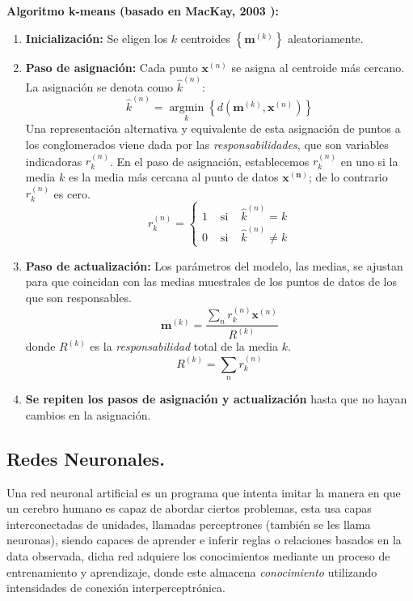 \documentclass[12pt,letterpaper,oneside,openright]{book}
\begin{document}
	\textbf{Algoritmo k-means (basado en MacKay, 2003 \cite{mackay03}):}
	\begin{enumerate}
		\item \textbf{Inicialización:} 
		Se eligen los $k$ centroides $\left\{\mathbf{m}^{(k)}\right\}$ aleatoriamente.
		\item \textbf{Paso de asignación:}
		Cada punto $\mathbf{x}^{(n)}$ se asigna al centroide más cercano. La asignación se denota como $\hat{k}^{(n)}$:
		\begin{equation}
			\label{eq:k_mean_asig}
			\hat{k}^{(n)}=\underset{k}{\operatorname{argmin}}\left\{d\left(\mathbf{m}^{(k)}, \mathbf{x}^{(n)}\right)\right\}
		\end{equation}
		Una representación alternativa y equivalente de esta asignación de puntos a los conglomerados viene dada por las \textit{responsabilidades}, que son variables indicadoras $r_k^{(n)}$. En el paso de asignación, establecemos $r_k^{(n)}$ en uno si la media $k$ es la media más cercana al punto de datos $\mathbf{x^{(n)}}$; de lo contrario $r_k^{(n)}$ es cero.
		\begin{equation}
			\label{eq:cond_rk}
			r_k^{(n)}=\left\{\begin{array}{lll}
				1 & \text { si } & \hat{k}^{(n)}=k \\
				0 & \text { si } & \hat{k}^{(n)} \neq k
			\end{array}\right.
		\end{equation}
		\item \textbf{Paso de actualización:}
		Los parámetros del modelo, las medias, se ajustan para que coincidan con las medias muestrales de los puntos de datos de los que son responsables.
		\begin{equation}
			\label{eq:media_muestral}
			\mathbf{m}^{(k)}=\frac{\sum_n r_k^{(n)} \mathbf{x}^{(n)}}{R^{(k)}}
		\end{equation}
		donde $R^{(k)}$ es la \textit{responsabilidad} total de la media $k$.
		\begin{equation}
			\label{eq:rk}
			R^{(k)}=\sum_n r_k^{(n)}
		\end{equation}
		\item \textbf{Se repiten los pasos de asignación y actualización} hasta que no hayan cambios en la asignación.
	\end{enumerate}
	
\subsection{Redes Neuronales.}
	Una red neuronal artificial es un programa que intenta imitar la manera en que un cerebro humano es capaz de abordar ciertos problemas, esta usa capas interconectadas de unidades, llamadas perceptrones (también se les llama neuronas), siendo capaces de aprender e inferir reglas o relaciones basados en la data observada, dicha red adquiere los conocimientos mediante un proceso de entrenamiento y aprendizaje, donde este almacena \textit{conocimiento} utilizando intensidades de conexión interperceptrónica. 
\end{document}

